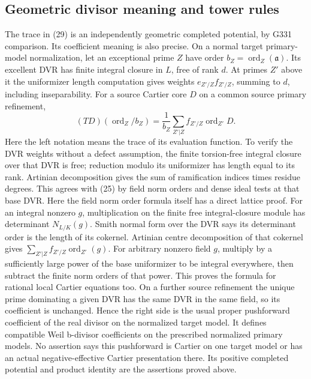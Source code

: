 \documentclass[11pt]{article}
\begin{document}
\subsection*{Geometric divisor meaning and tower rules}
The trace in (29) is an independently geometric completed
potential, by G331 comparison. Its coefficient meaning is also
precise. On a normal target primary-model normalization, let
an exceptional prime \(Z\) have order \(b_Z=\operatorname{ord}_Z
(\mathfrak a)\). Its excellent DVR has finite integral closure
in \(L\), free of rank \(d\). At primes \(Z'\) above it the
uniformizer length computation gives weights
\(e_{Z'/Z}f_{Z'/Z}\), summing to \(d\), including inseparability.
For a source Cartier core \(D\) on a common source primary
refinement,
\[
 (TD)(\operatorname{ord}_Z/b_Z)
       =\frac1{b_Z}\sum_{Z'|Z}f_{Z'/Z}\operatorname{ord}_{Z'}D.
                                                               \tag{32}
\]
Here the left notation means the trace of its evaluation
function. To verify the DVR weights without a defect
assumption, the finite torsion-free integral closure over
that DVR is free; reduction modulo its uniformizer has
length equal to its rank. Artinian decomposition gives
the sum of ramification indices times residue degrees.
This agrees with (25) by field norm orders and dense ideal
tests at that base DVR.
Here the field norm order formula itself has a direct lattice
proof. For an integral nonzero \(g\), multiplication on the
finite free integral-closure module has determinant
\(N_{L/K}(g)\). Smith normal form over the DVR says its
determinant order is the length of its cokernel.
Artinian centre decomposition of that cokernel gives
\(\sum_{Z'|Z}f_{Z'/Z}\operatorname{ord}_{Z'}(g)\).
For arbitrary nonzero field \(g\), multiply by a sufficiently
large power of the base uniformizer to be integral everywhere,
then subtract the finite norm orders of that power. This
proves the formula for rational local Cartier equations too.
On a further source refinement the unique prime dominating
a given DVR has the same DVR in the same field, so its
coefficient is unchanged. Hence the right side is the
usual proper pushforward coefficient of the real divisor
on the normalized target model. It defines compatible Weil
b-divisor coefficients on the prescribed normalized primary
models. No assertion says this pushforward is Cartier on
one target model or has an actual negative-effective
Cartier presentation there. Its positive completed potential
and product identity are the assertions proved above.
\end{document}
